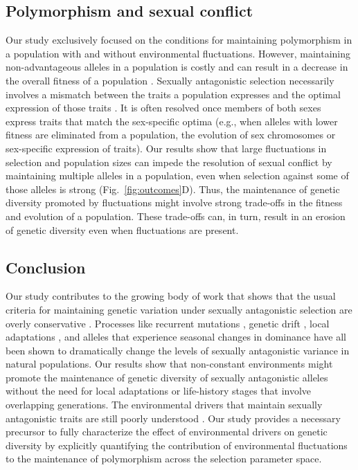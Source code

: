 \documentclass[12pt]{article}
\begin{document}
 \subsection*{Polymorphism and sexual conflict}

 Our study exclusively focused on the conditions for maintaining polymorphism in a population with and without environmental fluctuations. However, maintaining non-advantageous alleles in a population is costly and can result in a decrease in the overall fitness of a population \citep{gavrilets2014sexual,connallon2018environmental}. Sexually antagonistic selection necessarily involves a mismatch between the traits a population expresses and the optimal expression of those traits \citep{lande1980sexual}. It is often resolved once members of both sexes express traits that match the sex-specific optima (e.g., when alleles with lower fitness are eliminated from a population, the evolution of sex chromosomes or sex-specific expression of traits)\citep{lande1980sexual, arnqvist2013sexual}. Our results show that large fluctuations in selection and population sizes can impede the resolution of sexual conflict by maintaining multiple alleles in a population, even when selection against some of those alleles is strong (Fig.~\ref{fig:outcomes}D). Thus, the maintenance of genetic diversity promoted by fluctuations might involve strong trade-offs in the fitness and evolution of a population. These trade-offs can, in turn, result in an erosion of genetic diversity even when fluctuations are present.


 \subsection*{Conclusion}
Our study contributes to the growing body of work that shows that the usual criteria for maintaining genetic variation under sexually antagonistic selection are overly conservative \citep{connallon2012general,connallon_evolutionary_2018}. Processes like recurrent mutations \citep{radwan_maintenance_2008}, genetic drift \citep{connallon2012general}, local adaptations \citep{connallon_evolutionary_2018}, and alleles that experience seasonal changes in dominance \citep{wittmann2017seasonally} have all been shown to dramatically change the levels of sexually antagonistic variance in natural populations. Our results show that non-constant environments might promote the maintenance of genetic diversity of sexually antagonistic alleles without the need for local adaptations or life-history stages that involve overlapping generations. The environmental drivers that maintain sexually antagonistic traits are still poorly understood \citep{connallon2018environmental}. Our study provides a necessary precursor to fully characterize the effect of environmental drivers on genetic diversity by explicitly quantifying the contribution of environmental fluctuations to the maintenance of polymorphism across the selection parameter space.
 \clearpage
\clearpage
\end{document}
